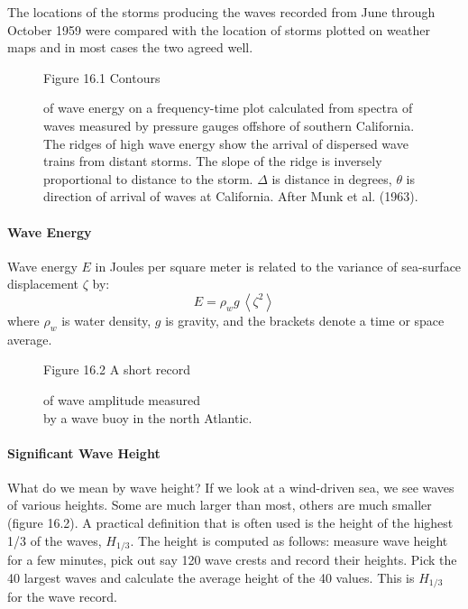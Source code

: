 The locations of the storms producing the waves recorded from June
through October 1959 were compared with the location of storms plotted
on weather maps and in most cases the two agreed well.

\begin{figure}[t!]
\footnotesize
Figure 16.1 Contours \rule{0mm}{4ex}of wave energy on a frequency-time
plot calculated from spectra of waves measured by pressure gauges
offshore of southern California. The ridges of high wave energy show
the arrival of dispersed wave trains from distant storms. The slope of
the ridge is inversely proportional to distance to the storm.
$\Delta$ is distance in degrees, $\theta$ is direction of arrival of
waves at California. After Munk et al. (1963).
\label{fig:dispersedwaves}
\vspace{-3ex}
\end{figure}

\paragraph{Wave Energy}
Wave energy $E$ in Joules per square meter is
related to the variance of sea-surface displacement $\zeta$ by:
 \begin{equation}
 E = \rho _{w} g \, \left< \zeta ^{2} \right>
 \end{equation}
where $\rho _{w}$ is water density, $g$ is gravity, and the brackets
denote a time or space average.

\begin{figure}[h!]
\vspace{1ex}
\centering
\footnotesize
Figure 16.2 A short record \rule{0mm}{3ex}of wave amplitude
measured\\ by a wave buoy in the north Atlantic.

\label{fig:waveheight}
\vspace{-1ex}
\end{figure}

\paragraph{Significant Wave Height}
What do we mean by wave height? If we
look at a wind-driven sea, we see waves of various heights. Some are
much larger than most, others are much smaller (figure 16.2). A
practical definition that is often used is the height of the highest
1/3 of the waves, $H_{1/3}$. The height is computed as follows:
measure wave height for a few minutes, pick out say 120 wave crests
and record their heights. Pick the 40 largest waves and calculate the
average height of the 40 values. This is $H_{1/3}$ for the wave
record.


